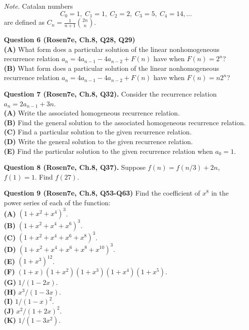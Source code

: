 \documentclass[jou]{apa6}
\begin{document}
{\em Note.} Catalan numbers 
$$C_0=1,\; C_1=1,\; C_2=2,\; C_3=5,\; C_4=14,\ldots$$
are defined as ${\displaystyle C_n = \frac{1}{n+1}{2n \choose n}}$.

\vspace{10pt}
{\bf Question 6  (Rosen7e, Ch.8, Q28, Q29)}\\
{\bf (A)} What form does a particular solution of the linear nonhomogeneous 
recurrence relation $a_n = 4a_{n-1} - 4a_{n-2} + F(n)$ have when $F(n) = 2^n$?\\
{\bf (B)} What form does a particular solution of the linear nonhomogeneous 
recurrence relation $a_n = 4a_{n-1} - 4a_{n-2} + F(n)$ have when $F(n) = n2^n$?


 

\vspace{10pt}
{\bf Question 7 (Rosen7e, Ch.8, Q32).}
Consider the recurrence relation $a_n = 2a_{n-1} + 3n$.\\
{\bf (A)} Write the associated homogeneous recurrence relation.\\
{\bf (B)} Find the general solution to the associated homogeneous recurrence relation.\\
{\bf (C)} Find a particular solution to the given recurrence relation.\\
{\bf (D)} Write the general solution to the given recurrence relation.\\
{\bf (E)} Find the particular solution to the given recurrence relation when $a_0 = 1$.


\vspace{10pt}
{\bf Question 8 (Rosen7e, Ch.8, Q37).} 
Suppose $f(n) = f(n/3) + 2n$, $f(1) = 1$. Find $f(27)$.


\vspace{10pt}
{\bf Question 9  (Rosen7e, Ch.8, Q53-Q63)} 
Find the coefficient of $x^8$ in the power series of each of the function:\\
{\bf (A)} $(1 + x^2 + x^4)^3$.\\
{\bf (B)} $(1 + x^2 + x^4 + x^6)^3$.\\
{\bf (C)} $(1 + x^2 + x^4 + x^6 + x^8)^3$.\\
{\bf (D)} $(1 + x^2 + x^4 + x^6 + x^8 + x^{10})^3$.\\
{\bf (E)} $(1 + x^3)^{12}$.\\
{\bf (F)} $(1 + x)(1 + x^2)(1 + x^3)(1 + x^4)(1 + x^5)$.\\
{\bf (G)} $1/(1 - 2x)$.\\
{\bf (H)} $x^3/(1 - 3x)$.\\
{\bf (I)} $1/(1 - x)^2$.\\
{\bf (J)} $x^2/(1 + 2x)^{2}$.\\
{\bf (K)} $1/(1 - 3x^2)$.
\end{document}
